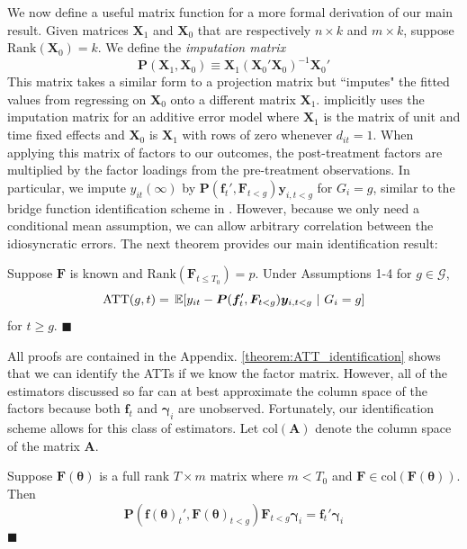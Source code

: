 \documentclass[12pt]{article}
\def\ATT{\text{ATT}}
\begin{document}
We now define a useful matrix function for a more formal derivation of our main result. Given matrices $\bm X_1$ and $\bm X_0$ that are respectively $n \times k$ and $m \times k$, suppose $\text{Rank}( \bm X_0) = k$. We define the \emph{imputation matrix} 
\begin{equation}
  \bm P(\bm X_1, \bm X_0) \equiv \bm X_1 (\bm X_0' \bm X_0)^{-1} \bm X_0'
\end{equation}
This matrix takes a similar form to a projection matrix but ``imputes" the fitted values from regressing on $\bm X_0$ onto a different matrix $\bm X_1$. \citet{Gardner_2021} implicitly uses the imputation matrix for an additive error model where $\bm X_1$ is the matrix of unit and time fixed effects and $\bm X_0$ is $\bm X_1$ with rows of zero whenever $d_{it} = 1$. When applying this matrix of factors to our outcomes, the post-treatment factors are multiplied by the factor loadings from the pre-treatment observations. In particular, we impute $y_{it}(\infty)$ by $\bm P(\bm f_{t}', \bm F_{t < g}) \bm y_{i,t < g}$ for $G_i = g$, similar to the bridge function identification scheme in \citet{Imbens_Kallus_Mao_2021}. However, because we only need a conditional mean assumption, we can allow arbitrary correlation between the idiosyncratic errors. The next theorem provides our main identification result:

\begin{theorem}\label{theorem:ATT_identification}
  Suppose $\bm F$ is known and $\text{Rank}(\bm F_{t \leq T_0}) = p$. Under Assumptions 1-4 for $g \in \mathcal{G}$,
  \begin{equation}\label{eq:ATT_moments}
    \ATT(g,t) = \expec{y_{it} - \bm P(\bm f_{t}', \bm F_{t < g}) \bm y_{i,t < g}}{G_i = g}
  \end{equation}
  for $t \geq g$. $\blacksquare$
\end{theorem}

All proofs are contained in the Appendix. \autoref{theorem:ATT_identification} shows that we can identify the ATTs if we know the factor matrix. However, all of the estimators discussed so far can at best approximate the column space of the factors because both $\bm f_t$ and $\bm \gamma_i$ are unobserved. Fortunately, our identification scheme allows for this class of estimators. Let $\text{col}(\bm A)$ denote the column space of the matrix $\bm A$.  

\begin{theorem}\label{theorem:rotation_indeterminancy}
  Suppose $\bm F(\bm \theta)$ is a full rank $T \times m$ matrix where $m < T_0$ and $\bm F \in \text{col}(\bm F(\bm \theta))$. Then
  \begin{equation}
    \bm P(\bm f(\bm \theta)_t', \bm F(\bm \theta)_{t < g}) \bm F_{t < g} \bm \gamma_i = \bm f_t' \bm \gamma_i
  \end{equation}
  $\blacksquare$
\end{theorem}
\end{document}
